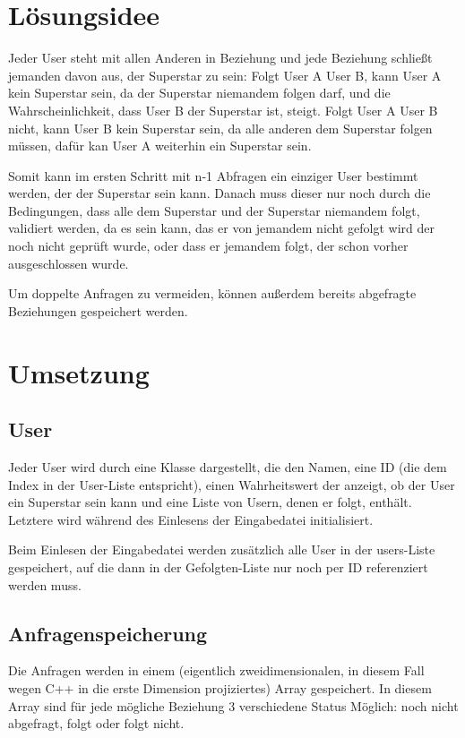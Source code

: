 \documentclass[a4paper,10pt,ngerman]{scrartcl}
\title{\Aufgabe}
\author{\Name\\Team-ID: \TeamId}
\date{\today}
\begin{document}
\maketitle
\pagebreak
\tableofcontents
\pagebreak

\section{Lösungsidee}
Jeder User steht mit allen Anderen in Beziehung und jede Beziehung schließt jemanden davon aus, der Superstar zu sein: Folgt User A User B, kann User A kein Superstar sein, da der Superstar niemandem folgen darf, und die Wahrscheinlichkeit, dass User B der Superstar ist, steigt. Folgt User A User B nicht, kann User B kein Superstar sein, da alle anderen dem Superstar folgen müssen, dafür kan User A weiterhin ein Superstar sein.

Somit kann im ersten Schritt mit n-1 Abfragen ein einziger User bestimmt werden, der der Superstar sein kann. Danach muss dieser nur noch durch die Bedingungen, dass alle dem Superstar und der Superstar niemandem folgt, validiert werden, da es sein kann, das er von jemandem nicht gefolgt wird der noch nicht geprüft wurde, oder dass er jemandem folgt, der schon vorher ausgeschlossen wurde.

Um doppelte Anfragen zu vermeiden, können außerdem bereits abgefragte Beziehungen gespeichert werden.

\pagebreak
\section{Umsetzung}

\subsection{User}
Jeder User wird durch eine Klasse dargestellt, die den Namen, eine ID (die dem Index in der User-Liste entspricht), einen Wahrheitswert der anzeigt, ob der User ein Superstar sein kann und eine Liste von Usern, denen er folgt, enthält. Letztere wird während des Einlesens der Eingabedatei initialisiert.

Beim Einlesen der Eingabedatei werden zusätzlich alle User in der users-Liste gespeichert, auf die dann in der Gefolgten-Liste nur noch per ID referenziert werden muss.

\subsection{Anfragenspeicherung}
Die Anfragen werden in einem (eigentlich zweidimensionalen, in diesem Fall wegen C++ in die erste Dimension projiziertes) Array gespeichert. In diesem Array sind für jede mögliche Beziehung 3 verschiedene Status Möglich: noch nicht abgefragt, folgt oder folgt nicht.
\end{document}
